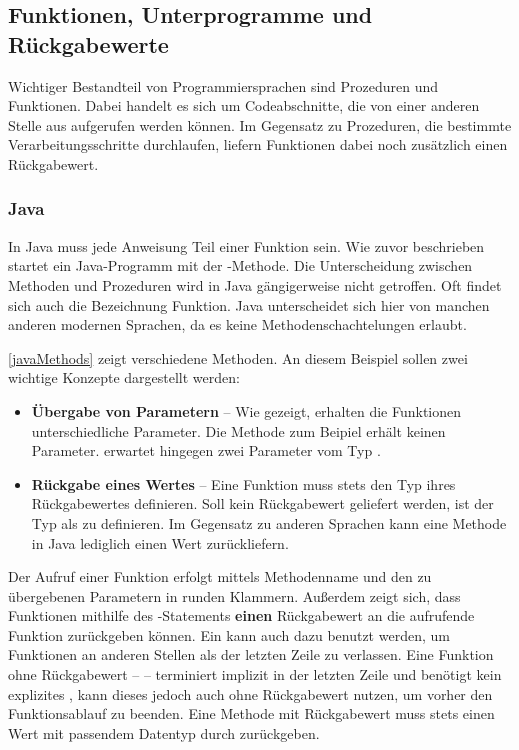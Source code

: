 \subsection{Funktionen, Unterprogramme und Rückgabewerte}\label{sec:functionsAndReturnValues}
Wichtiger Bestandteil von Programmiersprachen sind Prozeduren und Funktionen. Dabei handelt es sich um Codeabschnitte, die von einer anderen Stelle aus aufgerufen werden können. Im Gegensatz zu Prozeduren, die bestimmte Verarbeitungsschritte durchlaufen, liefern Funktionen dabei noch zusätzlich einen Rückgabewert.

\subsubsection*{Java}
In Java muss jede Anweisung Teil einer Funktion sein. Wie zuvor beschrieben startet ein Java-Programm mit der -Methode. Die Unterscheidung zwischen Methoden und Prozeduren wird in Java gängigerweise nicht getroffen. Oft findet sich auch die Bezeichnung Funktion. Java unterscheidet sich hier von manchen anderen modernen Sprachen, da es keine Methodenschachtelungen erlaubt.

\autoref{javaMethods} zeigt verschiedene Methoden. An diesem Beispiel sollen zwei wichtige Konzepte dargestellt werden: 
\begin{itemize}
    \item \textbf{Übergabe von Parametern} -- Wie gezeigt, erhalten die Funktionen unterschiedliche Parameter. Die Methode  zum Beipiel erhält keinen Parameter.  erwartet hingegen zwei Parameter vom Typ .
    \item \textbf{Rückgabe eines Wertes} -- Eine Funktion muss stets den Typ ihres Rückgabewertes definieren. Soll kein Rückgabewert geliefert werden, ist der Typ als  zu definieren. Im Gegensatz zu anderen Sprachen kann eine Methode in Java lediglich einen Wert zurückliefern.
\end{itemize}


Der Aufruf einer Funktion erfolgt mittels Methodenname und den zu übergebenen Parametern in runden Klammern. Außerdem zeigt sich, dass Funktionen mithilfe des -Statements \textbf{einen} Rückgabewert an die aufrufende Funktion zurückgeben können. Ein  kann auch dazu benutzt werden, um Funktionen an anderen Stellen als der letzten Zeile zu verlassen. Eine Funktion ohne Rückgabewert --  -- terminiert implizit in der letzten Zeile und benötigt kein explizites , kann dieses jedoch auch ohne Rückgabewert nutzen, um vorher den Funktionsablauf zu beenden. Eine Methode mit Rückgabewert muss stets einen Wert mit passendem Datentyp durch  zurückgeben.

